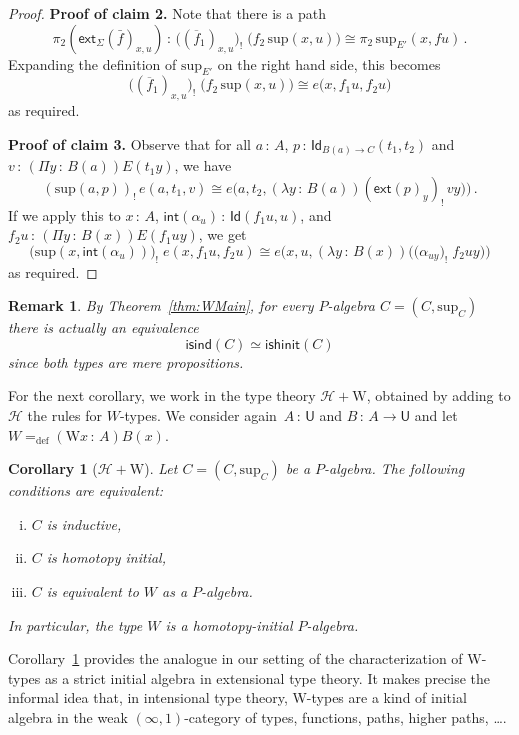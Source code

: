 \documentclass[10pt,a4paper,oneside,reqno]{amsart}
\numberwithin{equation}{section}
\theoremstyle{mythm}
\newtheorem{corollary}[theorem]{Corollary}
\theoremstyle{mydef}
\theoremstyle{myrmk}
\newtheorem{remark}[theorem]{Remark}
\newcommand{\defeq}{=_{\mathrm{def}}}
\newcommand{\co}{\,{:}\,}
\newcommand{\Hint}{\mathcal{H}}
\newcommand{\isalgind}{\mathsf{isind}}
\newcommand{\isalghinit}{\mathsf{ishinit}}
\newcommand{\ext}{\mathsf{ext}}
\renewcommand{\int}{\mathsf{int}}
\newcommand{\Id}{\mathsf{Id}}
\newcommand{\W}{\mathrm{W}}
\newcommand{\U}{\mathsf{U}}
\renewcommand{\sup}{\mathrm{sup}}
\begin{document}
\begin{proof}
 \noindent
 \textbf{Proof of claim 2.} Note that there is a path 
\[
\pi_2(\ext_\Sigma(\bar{f})_{x,u}) \co
 \big( (\overline{f}_1)_{x,u} \big)_{!} \; \big(f_2 \, \sup(x,u) \big) \cong \pi_2 \,  \sup_{E'}(x, f  u)\, .
\]
Expanding the definition of $\sup_{E'}$ on the right hand side, this becomes
\[
 \big( (\overline{f}_1)_{x,u} \big)_{!} \; \big( f_2 \, \sup(x,u) \big)
\cong  e\big(x,  f_1 u,  f_2 u \big) 
\]
as required.

 \bigskip
 
  \noindent
 \textbf{Proof of claim 3.} Observe that for all $a \co A$, $p \co \Id_{B(a) \to C}(t_1, t_2)$  and 
$v \co (\Pi y \co B(a))E(t_1y)$, we have
\[ 
(\sup(a,p))_{!}\, e(a,t_1,v) \cong 
e \big( a, t_2,  (\lambda y \co B(a)) ( \ext(p)_y )_{!}\, v y \big) \big) \, . 
\]
If we apply this to $x \co A$, $\int(\alpha_u) \co \Id( f_1 u, u)$, and $f_2 u \co
(\Pi y \co B(x)) E(f_1 u y)$, we get
\[
\big( \sup(x,\int(\alpha_u)) \big)_{!} \; e(x, f_1 u , f_2 u) \cong 
  e\big(x, u , (\lambda y \co B(x)) \big( (\alpha_{u y} \big)_{!} \;  f_2 u y  \big) \big)
\]
as required.
\end{proof}


\begin{remark} By Theorem~\ref{thm:WMain}, for every $P$-algebra $C = (C, \sup_C)$ there is actually an equivalence 
\[
\isalgind(C) \simeq \isalghinit(C)
\]
since both types are mere propositions.  
\end{remark}

For the next corollary, we work in the type theory $\Hint + \W$, obtained by adding to $\Hint$ the rules for $W$-types.
We consider again~$A \co \U$ and $B \co A \to \U$ and let~$W \defeq (\W x \co A) B(x)$.

\begin{corollary}[$\Hint + \W$]
\label{lem:WInitInt} Let $C = (C, \sup_C)$ be a $P$-algebra. The following conditions are
equivalent:
\begin{enumerate}[(i)]
\item $C$ is inductive,
\item $C$ is homotopy initial,
\item $C$ is equivalent to $W$ as a $P$-algebra.
\end{enumerate}
In particular, the type $W$ is a homotopy-initial $P$-algebra.
\end{corollary}


Corollary~\ref{lem:WInitInt} provides the analogue in our setting of the characterization of W-types as a strict initial algebra in extensional type theory. It makes precise the informal idea that, in intensional type theory, W-types are a kind of initial algebra in the weak $(\infty, 1)$-category of types, functions, paths, higher paths, \ldots.  
\end{document}
